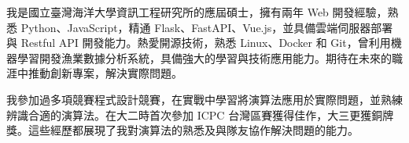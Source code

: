 

\begin{cvparagraph}

我是國立臺灣海洋大學資訊工程研究所的應屆碩士，擁有兩年 Web 開發經驗，熟悉 Python、JavaScript，精通 Flask、FastAPI、Vue.js，並具備雲端伺服器部署與 Restful API 開發能力。熱愛開源技術，熟悉 Linux、Docker 和 Git，曾利用機器學習開發漁業數據分析系統，具備強大的學習與技術應用能力。期待在未來的職涯中推動創新專案，解決實際問題。

我參加過多項競賽程式設計競賽，在實戰中學習將演算法應用於實際問題，並熟練辨識合適的演算法。在大二時首次參加 ICPC 台灣區賽獲得佳作，大三更獲銅牌獎。這些經歷都展現了我對演算法的熟悉及與隊友協作解決問題的能力。
\end{cvparagraph}
